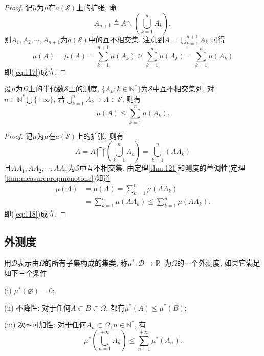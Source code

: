 \begin{proof}
	记$\tilde{\mu}$为$\mu$在$a(\mathscr{S})$上的扩张, 命\begin{equation}
		A_{n+1} \triangleq A\backslash \left( \bigcup_{k=1}^n A_k \right),
	\end{equation}
	则$A_1,A_2,\cdots,A_{n+1}$为$a(\mathscr{S})$中的互不相交集. 注意到$A = \bigcup_{k=1}^{n+1}A_k$ 可得
	\begin{equation}
		\mu(A) = \tilde{\mu}(A) = \sum_{k=1}^{n+1}\tilde{\mu}(A_k)\geqslant \sum_{k=1}^n \tilde{\mu}(A_k) = \sum_{k=1}^n \mu(A_k)
	\end{equation}
	即(\ref{eq:117})成立.
\end{proof}

\begin{theorem}[测度的次可加性]
	设$\mu$为$\Omega$上的半代数$\mathscr{S}$上的测度, $\{A_k:k\in\mathbb{N}^*\}$为$\mathscr{S}$中互不相交集列. 对$n\in\mathbb{N}^*\bigcup\{+\infty\}$,
	若$\bigcup_{k=1}^n A_k\supset A\in\mathscr{S}$, 则有
	\begin{equation}
		\mu(A) \leqslant \sum_{k=1}^n\mu(A_k).\label{eq:118}
	\end{equation}
\end{theorem}
\begin{proof}
	记$\tilde{\mu}$为$\mu$在$a(\mathscr{S})$上的扩张, 则有
	\begin{equation}
		A = A\bigcap\left( \bigcup_{k=1}^n A_k \right) = \bigcup_{k=1}^n(AA_k)
	\end{equation}
	且$AA_1,AA_2,\cdots,AA_n$为$\mathscr{S}$中互不相交集. 由定理\ref{thm:121}和测度的单调性(定理\ref{thm:measurepropmonotone})知道
	\begin{align}
		\mu(A)&=\tilde{\mu}(A)=\sum_{k=1}^n\tilde{\mu}(AA_k)\nonumber\\
		&=\sum_{k=1}^n\mu(AA_k)\leqslant \sum_{k=1}^n\mu(AA_k).
	\end{align}
	即(\ref{eq:118})成立.
\end{proof}

\subsection{外测度}
\begin{definition}[外测度]
	用$\mathscr{D}$表示由$\Omega$的所有子集构成的集类, 称$\mu^*:\mathscr{D}\to\overline{\mathbb{R}}_+$为$\Omega$的一个外测度, 
	如果它满足如下三个条件
	\begin{blist}
		\item[(i)] $\mu^*(\varnothing) = 0$;
		\item[(ii)] 不降性: 对于任何$A\subset B\subset \Omega$, 都有$\mu^*(A)\leqslant\mu^*(B)$;
		\item[(iii)] 次$\sigma$-可加性: 对于任何$A_n\subset\Omega, n\in\mathbb{N}^*$, 有
		\begin{equation}\label{eq:externalmeasure_subsigmaaddi}
			\mu^*\left( \bigcup_{n = 1}^{+\infty}A_n \right) \leqslant \sum_{n=1}^{+\infty}\mu^*(A_n).
		\end{equation}
	\end{blist}
\end{definition}

